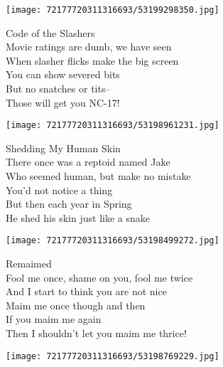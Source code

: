 \documentclass[10pt,letterpaper]{article}
\begin{document}
\begin{center}
\texttt{[image: 72177720311316693/53199298350.jpg]}
\end{center}

\begin{center}
Code of the Slashers\\
\vskip 0.2in
Movie ratings are dumb, we have seen\\
When slasher flicks make the big screen\\
You can show severed bits\\
But no snatches or tits--\\
Those will get you NC-17!\\
\end{center}
\pagebreak

\begin{center}\texttt{[image: 72177720311316693/53198961231.jpg]}
\end{center}
\begin{center}
Shedding My Human Skin\\
\vskip 0.2in
There once was a reptoid named Jake\\
Who seemed human, but make no mistake\\
You'd not notice a thing\\
But then each year in Spring\\
He shed his skin just like a snake\\
\end{center}
\pagebreak

\begin{center}
\texttt{[image: 72177720311316693/53198499272.jpg]}
\end{center}

\begin{center}
Remaimed\\
\vskip 0.2in
Fool me once, shame on you, fool me twice\\
And I start to think you are not nice\\
Maim me once though and then\\
If you maim me again\\
Then I shouldn't let you maim me thrice!\\
\end{center}
\pagebreak

\begin{center}
\texttt{[image: 72177720311316693/53198769229.jpg]}
\end{center}
\end{document}
